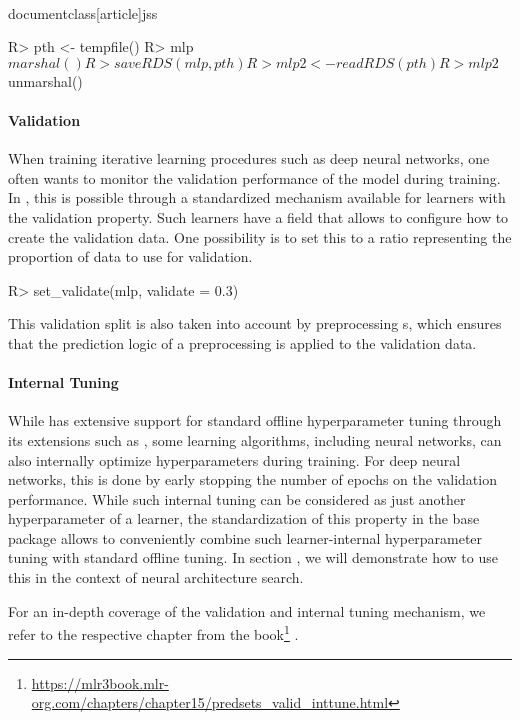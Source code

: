 \\documentclass[article]{jss}
\theoremstyle{definition}
\begin{document}
\begin{CodeInput}
R> pth <- tempfile()
R> mlp$marshal()
R> saveRDS(mlp, pth)
R> mlp2 <- readRDS(pth)
R> mlp2$unmarshal()
\end{CodeInput}

\paragraph{Validation}

When training iterative learning procedures such as deep neural networks, one often wants to monitor the validation performance of the model during training.
In , this is possible through a standardized mechanism available for learners with the validation property.
Such learners have a  field that allows to configure how to create the validation data.
One possibility is to set this to a ratio representing the proportion of data to use for validation.

\begin{CodeInput}
R> set_validate(mlp, validate = 0.3)
\end{CodeInput}

This validation split is also taken into account by preprocessing s, which ensures that the prediction logic of a preprocessing  is applied to the validation data.

\paragraph{Internal Tuning}

While \mlrt{} has extensive support for standard offline hyperparameter tuning through its extensions such as  \citep{ref-mlr3tuning2024}, some learning algorithms, including neural networks, can also internally optimize hyperparameters during training.
For deep neural networks, this is done by early stopping the number of epochs on the validation performance.
While such internal tuning can be considered as just another hyperparameter of a learner, the standardization of this property in the \mlrt{} base package allows to conveniently combine such learner-internal hyperparameter tuning with standard offline tuning.
In section , we will demonstrate how to use this in the context of neural architecture search.

For an in-depth coverage of the validation and internal tuning mechanism, we refer to the respective chapter from the  book\footnote{\url{https://mlr3book.mlr-org.com/chapters/chapter15/predsets\_valid\_inttune.html}} \citep{ref-mlr3book-valid}.
\end{document}
